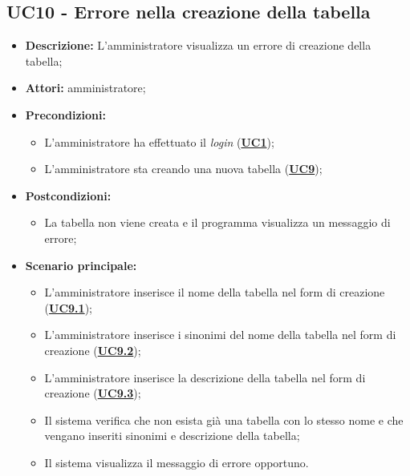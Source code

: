 \subsection{UC10 - Errore nella creazione della tabella}
\label{sec:UC10}
\begin{itemize}
	\item \textbf{Descrizione:} L’amministratore visualizza un errore di creazione della tabella;
	\item \textbf{Attori:} amministratore;
	\item \textbf{Precondizioni:} 
	\begin{itemize}
		\item L’amministratore ha effettuato il \textit{login} (\hyperref[sec:UC1]{\textbf{UC1}});
		\item L’amministratore sta creando una nuova tabella (\hyperref[sec:UC9]{\textbf{UC9}});
	\end{itemize}
	\item \textbf{Postcondizioni:} 
	\begin{itemize}
		\item La tabella non viene creata e il programma visualizza un messaggio di errore;
	\end{itemize}
	\item \textbf{Scenario principale:} 
	\begin{itemize}
		\item L’amministratore inserisce il nome della tabella nel form di creazione (\hyperref[sec:UC9.1]{\textbf{UC9.1}});
		\item L’amministratore inserisce i sinonimi del nome della tabella nel form di creazione (\hyperref[sec:UC9.2]{\textbf{UC9.2}});
		\item L’amministratore inserisce la descrizione della tabella nel form di creazione (\hyperref[sec:UC9.3]{\textbf{UC9.3}});
		\item Il sistema verifica che non esista già una tabella con lo stesso nome e che vengano inseriti sinonimi e descrizione della tabella;
		\item Il sistema visualizza il messaggio di errore opportuno.
	\end{itemize}
\end{itemize}

